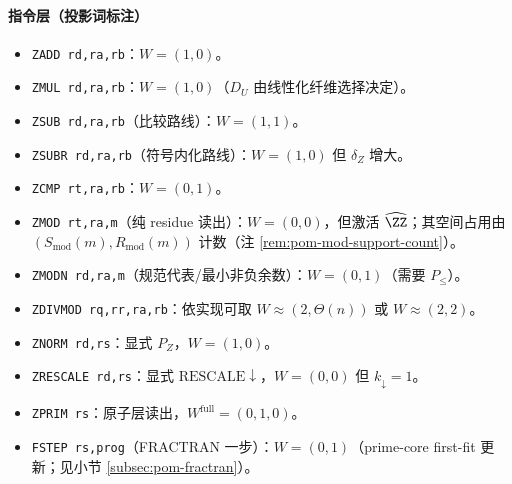 \paragraph{指令层（投影词标注）}
\begin{itemize}
  \item \texttt{ZADD rd,ra,rb}：$W=(1,0)$。
  \item \texttt{ZMUL rd,ra,rb}：$W=(1,0)$（$D_U$ 由线性化纤维选择决定）。
  \item \texttt{ZSUB rd,ra,rb}（比较路线）：$W=(1,1)$。
  \item \texttt{ZSUBR rd,ra,rb}（符号内化路线）：$W=(1,0)$ 但 $\delta_Z$ 增大。
  \item \texttt{ZCMP rt,ra,rb}：$W=(0,1)$。
  \item \texttt{ZMOD rt,ra,m}（纯 residue 读出）：$W=(0,0)$，但激活 $\widehat{\ZZ}$；其空间占用由 $(S_{\mathrm{mod}}(m),R_{\mathrm{mod}}(m))$ 计数（注 \ref{rem:pom-mod-support-count}）。
  \item \texttt{ZMODN rd,ra,m}（规范代表/最小非负余数）：$W=(0,1)$（需要 $P_{\le}$）。
  \item \texttt{ZDIVMOD rq,rr,ra,rb}：依实现可取 $W\approx(2,\Theta(n))$ 或 $W\approx(2,2)$。
  \item \texttt{ZNORM rd,rs}：显式 $P_Z$，$W=(1,0)$。
  \item \texttt{ZRESCALE rd,rs}：显式 $\mathrm{RESCALE}\downarrow$，$W=(0,0)$ 但 $k_{\downarrow}=1$。
  \item \texttt{ZPRIM rs}：原子层读出，$W^{\mathrm{full}}=(0,1,0)$。
  \item \texttt{FSTEP rs,prog}（FRACTRAN 一步）：$W=(0,1)$（prime-core first-fit 更新；见小节 \ref{subsec:pom-fractran}）。
\end{itemize}

